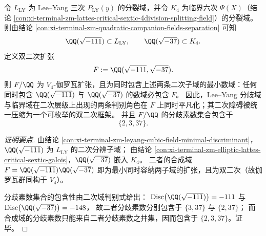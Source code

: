\begin{conclusion}\label{con:xi-terminal-zm-quadratic-simultaneous-obstruction-field}
令 \(L_{\mathrm{LY}}\) 为 Lee--Yang 三次 \(P_{\mathrm{LY}}(y)\) 的分裂域，并令 \(K_4\) 为临界六次 \(\Psi(X)\)（结论 \ref{con:xi-terminal-zm-lattes-critical-sextic-4division-splitting-field}）的分裂域。
则由结论 \ref{con:xi-terminal-zm-quadratic-companion-fields-separation} 可知
\[
\QQ(\sqrt{-111})\subset L_{\mathrm{LY}},
\qquad
\QQ(\sqrt{-37})\subset K_4.
\]
定义双二次扩张
\[
F:=\QQ(\sqrt{-111},\sqrt{-37}).
\]
则 \(F/\QQ\) 为 \(V_4\)-伽罗瓦扩张，且为同时包含上述两条二次子域的最小数域：任何同时包含 \(\QQ(\sqrt{-111})\) 与 \(\QQ(\sqrt{-37})\) 的数域必包含 \(F\)。
因此，Lee--Yang 分歧域与临界域在二次层级上出现的两条判别角色在 \(F\) 上同时平凡化；其二次障碍被统一压缩为一个可枚举的双二次框架。
并且 \(F/\QQ\) 的分歧素数集合包含于
\[
\{2,3,37\}.
\]
\end{conclusion}
\begin{proof}[证明要点]
由结论 \ref{con:xi-terminal-zm-leyang-cubic-field-minimal-discriminant}，\(\QQ(\sqrt{-111})\) 为 \(L_{\mathrm{LY}}\) 的二次分辨子域；
由结论 \ref{con:xi-terminal-zm-elliptic-lattes-critical-sextic-galois}，\(\QQ(\sqrt{-37})\) 嵌入 \(K_4\)。
二者的合成域 \(F=\QQ(\sqrt{-111})\QQ(\sqrt{-37})\) 即为最小同时容纳两子域的扩张，且为双二次（故伽罗瓦群同构于 \(V_4\)）。
\par
分歧素数集合的包含性由二次域判别式给出：
\(\mathrm{Disc}\bigl(\QQ(\sqrt{-111})\bigr)=-111\) 与 \(\mathrm{Disc}\bigl(\QQ(\sqrt{-37})\bigr)=-148\)，
故二者分歧素数分别包含于 \(\{3,37\}\) 与 \(\{2,37\}\)；
而合成域的分歧素数只能来自二者分歧素数之并集，因而包含于 \(\{2,3,37\}\)。证毕。
\end{proof}

